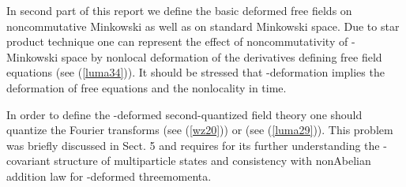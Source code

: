 \documentclass[a4paper,a4paper]{article}
\begin{document}
In second  part of this      report we define the basic deformed
free fields on noncommutative Minkowski as well as on standard
Minkowski space. Due to star product technique one can represent
the effect of noncommutativity of \myHighlight{$ \kappa$}\coordHE{}-Minkowski space by
nonlocal deformation of the derivatives defining free field
equations (see (\ref{luma34})). It should be stressed that
\myHighlight{$\kappa$}\coordHE{}-deformation implies
 the deformation of free equations and
 the nonlocality in time.

In order to     define the \myHighlight{$\kappa$}\coordHE{}-deformed second-quantized
field theory one should quantize the Fourier transforms \coordHE{}
(see (\ref{wz20})) or \coordHE{} (see
(\ref{luma29})). This problem was
briefly discussed in Sect. 5 and requires for its further understanding
 the \myHighlight{$\kappa$}\coordHE{}-covariant structure of multiparticle states
 and consistency with nonAbelian addition law for
 \myHighlight{$\kappa$}\coordHE{}-deformed threemomenta.
\end{document}
